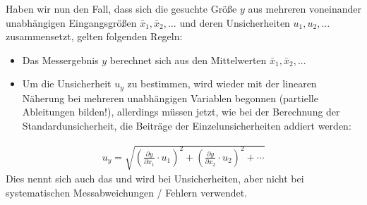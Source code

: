 \documentclass[letterpaper,10pt,english]{jupyterBook}
\begin{document}
\sphinxAtStartPar
Haben wir nun den Fall, dass sich die gesuchte Größe \(y\) aus mehreren voneinander unabhängigen Eingangsgrößen \(\bar x_1, \bar x_2, ...\) und deren Unsicherheiten \(u_1, u_2, ...\) zusammensetzt, gelten folgenden Regeln:
\begin{itemize}
\item {} 
\sphinxAtStartPar
Das Messergebnis \(y\) berechnet sich aus den Mittelwerten \(\bar x_1, \bar x_2, ...\)

\item {} 
\sphinxAtStartPar
Um die Unsicherheit \(u_y\) zu bestimmen, wird wieder mit der linearen Näherung bei mehreren unabhängigen Variablen begonnen (partielle Ableitungen bilden!), allerdings müssen jetzt, wie bei der Berechnung der Standardunsicherheit, die  Beiträge der Einzelunsicherheiten addiert werden:

\end{itemize}
\begin{equation*}
\begin{split}u_y = \sqrt{\left (\frac{\partial y}{\partial x_1} \cdot u_1 \right)^2 +\left (\frac{\partial y}{\partial x_2} \cdot u_2 \right)^2 +\cdots}\end{split}
\end{equation*}
\sphinxAtStartPar
Dies nennt sich auch das  und wird bei Unsicherheiten, aber nicht bei systematischen Messabweichungen / Fehlern verwendet.
\end{document}
